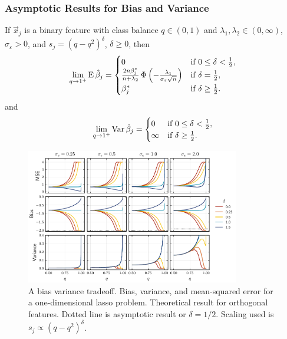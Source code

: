 \documentclass[aspectratio=1610,onlytextwidth]{beamer}
\begin{document}
\begin{frame}[c]
  \frametitle{Asymptotic Results for Bias and Variance}

  \begin{theorem}
    If \(\vec{x}_j\) is a binary feature with class balance \(q \in (0, 1)\) and \(\lambda_1,\lambda_2 \in (0,\infty)\), \(\sigma_\varepsilon > 0\), and \(s_j = (q - q^2)^{\delta}\), \(\delta \geq 0\), then
    \[
      \lim_{q \rightarrow 1^+} \operatorname{E} \hat{\beta}_j =
      \begin{cases}
        0                                                                                                  & \text{if } 0 \leq \delta < \frac{1}{2}, \\
        \frac{2n \beta_j^*}{n + \lambda_2} \operatorname{\Phi}\left(-\frac{\lambda_1}{\sigma_\varepsilon \sqrt{n}}\right) & \text{if } \delta = \frac{1}{2},        \\
        \beta^*_j                                                                                          & \text{if } \delta \geq \frac{1}{2}.
      \end{cases}
    \]
    \pause and
    \[
      \lim_{q \rightarrow 1^+} \operatorname{Var} \hat{\beta}_j =
      \begin{cases}
        0      & \text{if } 0 \leq \delta < \frac{1}{2}, \\
        \infty & \text{if } \delta \geq \frac{1}{2}.
      \end{cases}
    \]
  \end{theorem}

\end{frame}

\begin{frame}[c]

  \begin{figure}
    \centering
    \includegraphics[width=0.83\textwidth]{figures/bias-var-onedim.pdf}
    \caption{%
      A bias variance tradeoff. Bias, variance, and mean-squared error for a one-dimensional lasso problem. Theoretical result for orthogonal features. Dotted line is asymptotic result or \(\delta = 1/2\).
      Scaling used is \(s_j \propto (q - q^2)^\delta\).
    }
  \end{figure}

\end{frame}
\end{document}
